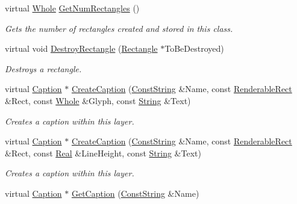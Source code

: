 \begin{DoxyCompactItemize}
virtual \hyperlink{namespacephys_a460f6bc24c8dd347b05e0366ae34f34a}{Whole} \hyperlink{classphys_1_1UI_1_1Layer_a1a006c096c7eb87669f00cb6a385567e}{GetNumRectangles} ()
\begin{DoxyCompactList}\small\item\em Gets the number of rectangles created and stored in this class. \item\end{DoxyCompactList}\item 
virtual void \hyperlink{classphys_1_1UI_1_1Layer_a8bfa08dad890a56e056054b09162cdf4}{DestroyRectangle} (\hyperlink{classphys_1_1UI_1_1Rectangle}{Rectangle} $\ast$ToBeDestroyed)
\begin{DoxyCompactList}\small\item\em Destroys a rectangle. \item\end{DoxyCompactList}\item 
virtual \hyperlink{classphys_1_1UI_1_1Caption}{Caption} $\ast$ \hyperlink{classphys_1_1UI_1_1Layer_a6722d243df34dbcf0337292b5bdb9cab}{CreateCaption} (\hyperlink{namespacephys_a5ce5049f8b4bf88d6413c47b504ebb31}{ConstString} \&Name, const \hyperlink{structphys_1_1UI_1_1RenderableRect}{RenderableRect} \&Rect, const \hyperlink{namespacephys_a460f6bc24c8dd347b05e0366ae34f34a}{Whole} \&Glyph, const \hyperlink{namespacephys_aa03900411993de7fbfec4789bc1d392e}{String} \&Text)
\begin{DoxyCompactList}\small\item\em Creates a caption within this layer. \item\end{DoxyCompactList}\item 
virtual \hyperlink{classphys_1_1UI_1_1Caption}{Caption} $\ast$ \hyperlink{classphys_1_1UI_1_1Layer_a82d231a873ea03ad80e70072800eecd4}{CreateCaption} (\hyperlink{namespacephys_a5ce5049f8b4bf88d6413c47b504ebb31}{ConstString} \&Name, const \hyperlink{structphys_1_1UI_1_1RenderableRect}{RenderableRect} \&Rect, const \hyperlink{namespacephys_af7eb897198d265b8e868f45240230d5f}{Real} \&LineHeight, const \hyperlink{namespacephys_aa03900411993de7fbfec4789bc1d392e}{String} \&Text)
\begin{DoxyCompactList}\small\item\em Creates a caption within this layer. \item\end{DoxyCompactList}\item 
virtual \hyperlink{classphys_1_1UI_1_1Caption}{Caption} $\ast$ \hyperlink{classphys_1_1UI_1_1Layer_af2dd8dc0a5b8775f069b98ce36ce9af6}{GetCaption} (\hyperlink{namespacephys_a5ce5049f8b4bf88d6413c47b504ebb31}{ConstString} \&Name)

\end{DoxyCompactItemize}
